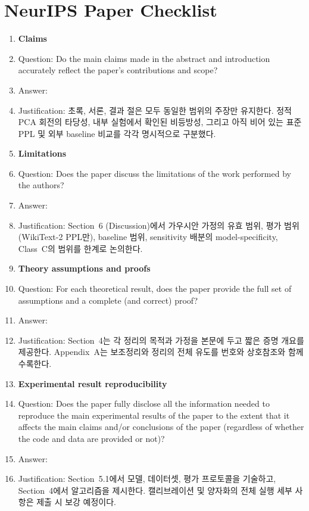\section*{NeurIPS Paper Checklist}

\begin{enumerate}

\item {\bf Claims}
    \item[] Question: Do the main claims made in the abstract and introduction accurately reflect the paper's contributions and scope?
    \item[] Answer: \answerYes{}
    \item[] Justification: 초록, 서론, 결과 절은 모두 동일한 범위의 주장만 유지한다. 정적 PCA 회전의 타당성, 내부 실험에서 확인된 비등방성, 그리고 아직 비어 있는 표준 PPL 및 외부 baseline 비교를 각각 명시적으로 구분했다.

\item {\bf Limitations}
    \item[] Question: Does the paper discuss the limitations of the work performed by the authors?
    \item[] Answer: \answerYes{}
    \item[] Justification: Section~6 (Discussion)에서 가우시안 가정의 유효 범위, 평가 범위 (WikiText-2 PPL만), baseline 범위, sensitivity 배분의 model-specificity, Class~C의 범위를 한계로 논의한다.

\item {\bf Theory assumptions and proofs}
    \item[] Question: For each theoretical result, does the paper provide the full set of assumptions and a complete (and correct) proof?
    \item[] Answer: \answerYes{}
    \item[] Justification: Section~4는 각 정리의 목적과 가정을 본문에 두고 짧은 증명 개요를 제공한다. Appendix~A는 보조정리와 정리의 전체 유도를 번호와 상호참조와 함께 수록한다.

\item {\bf Experimental result reproducibility}
    \item[] Question: Does the paper fully disclose all the information needed to reproduce the main experimental results of the paper to the extent that it affects the main claims and/or conclusions of the paper (regardless of whether the code and data are provided or not)?
    \item[] Answer: \answerNo{}
    \item[] Justification: Section~5.1에서 모델, 데이터셋, 평가 프로토콜을 기술하고, Section~4에서 알고리즘을 제시한다. 캘리브레이션 및 양자화의 전체 실행 세부 사항은 제출 시 보강 예정이다.


\end{enumerate}
